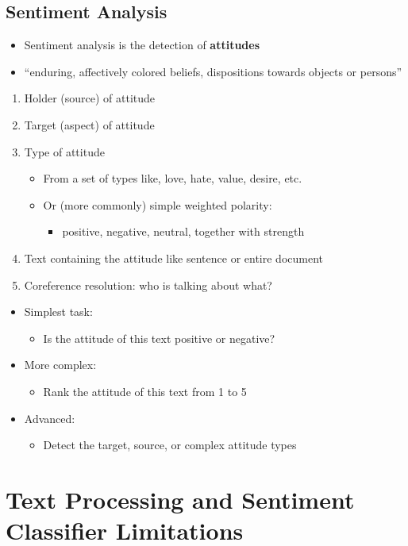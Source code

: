 \documentclass[11pt]{article}
\theoremstyle{definition}
\begin{document}
\subsection{Sentiment Analysis}
\begin{itemize}
  \item Sentiment analysis is the detection of \textbf{attitudes}
  \item “enduring, affectively colored beliefs, dispositions towards objects or persons”
\end{itemize}
\begin{enumerate}
  \item Holder (source) of attitude
  \item Target (aspect) of attitude
  \item Type of attitude
  \begin{itemize}
    \item From a set of types like, love, hate, value, desire, etc.
    \item Or (more commonly) simple weighted polarity: 
    \begin{itemize}
      \item positive, negative, neutral, together with strength
    \end{itemize}
  \end{itemize}
  \item Text containing the attitude like sentence or entire document
  \item Coreference resolution: who is talking about what?
\end{enumerate}
\begin{itemize}
  \item Simplest task:
  \begin{itemize}
    \item Is the attitude of this text positive or negative?
  \end{itemize}
  \item More complex:
  \begin{itemize}
    \item Rank the attitude of this text from 1 to 5
  \end{itemize}
  \item Advanced:
  \begin{itemize}
    \item Detect the target, source, or complex attitude types
  \end{itemize}
\end{itemize}

\section{Text Processing and
Sentiment Classifier
Limitations}
\end{document}
